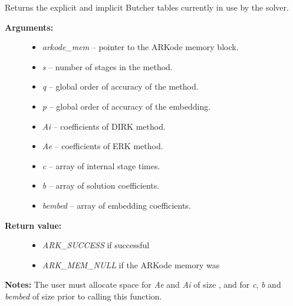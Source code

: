 \documentclass[letterpaper,10pt,english]{sphinxmanual}
\begin{document}
\begin{fulllineitems}
\label{c_interface/User_callable:ARKodeGetCurrentButcherTables}
Returns the explicit and implicit Butcher tables
currently in use by the solver.
\begin{description}
\item[{\textbf{Arguments:}}] \leavevmode\begin{itemize}
\item {} 
\emph{arkode\_mem} -- pointer to the ARKode memory block.

\item {} 
\emph{s} -- number of stages in the method.

\item {} 
\emph{q} -- global order of accuracy of the method.

\item {} 
\emph{p} -- global order of accuracy of the embedding.

\item {} 
\emph{Ai} -- coefficients of DIRK method.

\item {} 
\emph{Ae} -- coefficients of ERK method.

\item {} 
\emph{c} -- array of internal stage times.

\item {} 
\emph{b} -- array of solution coefficients.

\item {} 
\emph{bembed} -- array of embedding coefficients.

\end{itemize}

\item[{\textbf{Return value:}}] \leavevmode\begin{itemize}
\item {} 
\emph{ARK\_SUCCESS} if successful

\item {} 
\emph{ARK\_MEM\_NULL} if the ARKode memory was 

\end{itemize}

\end{description}

\textbf{Notes:}  The user must allocate space for \emph{Ae} and \emph{Ai} of size
, and for \emph{c}, \emph{b} and \emph{bembed} of size
 prior to calling this function.

\end{fulllineitems}
\end{document}

